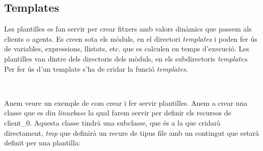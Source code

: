 \documentclass[a4paper]{article}
\begin{document}
\subsection{Templates}
Les plantilles es fan servir per crear fitxers amb valors dinàmics que passem als clients o agents. Es creen sota els mòduls, en el directori \textit{templates} i poden fer ús de variables, expressions, llistats, etc. que es calculen en temps d'execució. Les plantilles van dintre dels directoris dels mòduls, en els subdirectoris \textit{templates}. Per fer ús d'un template s'ha de cridar la funció \textit{templates}.
\begin{figure}[h]
	\centering
	\\ 
\end{figure}
Anem  veure un exemple de com crear i fer servir plantilles. Anem a crear una classe que es diu \textit{linuxbase} la qual farem servir per definir els recursos de client\_0. Aquesta classe tindrà una subclasse, que \'es a la que cridarà directament, \textit{tmp} que definirà un recurs de tipus file amb un contingut que estarà definit per una plantilla:
\end{document}
